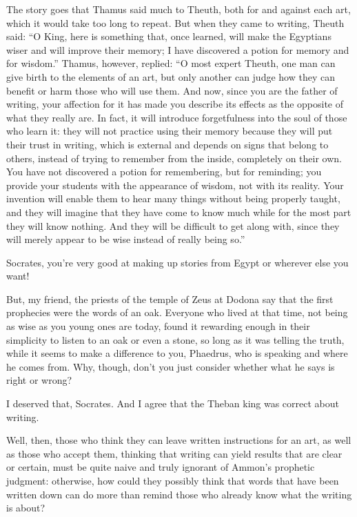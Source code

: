 The story goes that Thamus said much to Theuth, both for and against
each art, which it would take too long to repeat. But when they came to
writing, Theuth said: “O King, here is something that, once learned,
will make the Egyptians wiser and will improve their memory; I have
discovered a potion for memory and for wisdom.” Thamus, however,
replied: “O most expert Theuth, one man can give birth to the elements
of an art, but only another can judge how they can benefit or harm those
who will use them. And now, since you are the father of
writing, your affection for it has made you describe its effects as the
opposite of what they really are. In fact, it will introduce
forgetfulness into the soul of those who learn it: they will not
practice using their memory because they will put their trust in
writing, which is external and depends on signs that belong to others,
instead of trying to remember from the inside, completely on their own.
You have not discovered a potion for remembering, but for reminding; you
provide your students with the appearance of wisdom, not with its
reality. Your invention will enable them to hear many things without
being properly taught, and they will imagine that they have come
to know much while for the most part they will know nothing. And they
will be difficult to get along with, since they will merely appear to be
wise instead of really being so.”

\sayphaedrus Socrates, you're very good at making up stories from Egypt or
wherever else you want!

\saysocrates But, my friend, the priests of the temple of Zeus at Dodona
say that the first prophecies were the words of an oak. Everyone who
lived at that time, not being as wise as you young ones are today, found
it rewarding enough in their simplicity to listen to an oak or even a
stone, so long as it was telling the truth, while it seems to
make a difference to you, Phaedrus, who is speaking and where he comes
from. Why, though, don't you just consider whether what he says is right
or wrong?

\sayphaedrus I deserved that, Socrates. And I agree that the Theban king
was correct about writing.

\saysocrates Well, then, those who think they can leave written
instructions for an art, as well as those who accept them, thinking that
writing can yield results that are clear or certain, must be quite naive
and truly ignorant of Ammon's prophetic judgment: otherwise, how could
they possibly think that words that have been written down can
do more than remind those who already know what the writing is about?

